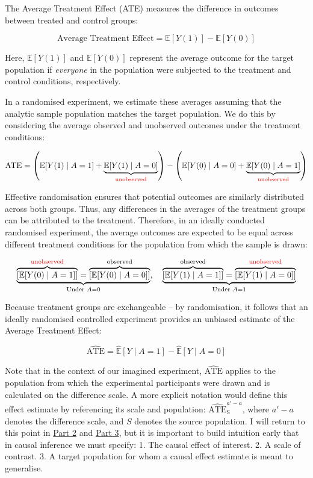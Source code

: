 \documentclass[
  single column]{article}
\begin{document}
The Average Treatment Effect (ATE) measures the difference in outcomes
between treated and control groups:

\[
\text{Average Treatment Effect} = \mathbb{E}[Y(1)] - \mathbb{E}[Y(0)]
\]

Here, \(\mathbb{E}[Y(1)]\) and \(\mathbb{E}[Y(0)]\) represent the
average outcome for the target population if \emph{everyone} in the
population were subjected to the treatment and control conditions,
respectively.

In a randomised experiment, we estimate these averages assuming that the
analytic sample population matches the target population. We do this by
considering the average observed and unobserved outcomes under the
treatment conditions:

\[
\text{ATE} = \left(\mathbb{E}[Y(1) \mid A = 1] + \underbrace{\mathbb{E}[Y(1) \mid A = 0]}_{\textcolor{red}{\text{unobserved}}}\right) - \left(\mathbb{E}[Y(0) \mid A = 0] + \underbrace{\mathbb{E}[Y(0) \mid A = 1]}_{\textcolor{red}{\text{unobserved}}}\right)
\]

Effective randomisation ensures that potential outcomes are similarly
distributed across both groups. Thus, any differences in the averages of
the treatment groups can be attributed to the treatment. Therefore, in
an ideally conducted randomised experiment, the average outcomes are
expected to be equal across different treatment conditions for the
population from which the sample is drawn:

\[
\underbrace{\overbrace{\left[\mathbb{E}[Y(0) \mid A = 1]\right]}^{\textcolor{red}{\text{unobserved}}} = \overbrace{\left[\mathbb{E}[Y(0) \mid A = 0]\right]}^{\text{observed}}}_{\text{Under } A = 0}, \quad \underbrace{\overbrace{\left[\mathbb{E}[Y(1) \mid A = 1]\right]}^{\text{observed}} = \overbrace{\left[\mathbb{E}[Y(1) \mid A = 0]\right]}^{\textcolor{red}{\text{unobserved}}}}_{\text{Under } A = 1}
\]

Because treatment groups are exchangeable -- by randomisation, it
follows that an ideally randomised controlled experiment provides an
unbiased estimate of the Average Treatment Effect:

\[
\widehat{\text{ATE}} = \widehat{\mathbb{E}}[Y \mid A = 1] - \widehat{\mathbb{E}}[Y \mid A = 0]
\]

Note that in the context of our imagined experiment,
\(\widehat{\text{ATE}}\) applies to the population from which the
experimental participants were drawn and is calculated on the difference
scale. A more explicit notation would define this effect estimate by
referencing its scale and population:
\(\widehat{\text{ATE}}^{a'-a}_{\text{S}}\), where \(a'-a\) denotes the
difference scale, and \(S\) denotes the source population. I will return
to this point in \hyperref[id-sec-2]{Part 2} and
\hyperref[id-sec-3]{Part 3}, but it is important to build intuition
early that in causal inference we must specify: 1. The causal effect of
interest. 2. A scale of contrast. 3. A target population for whom a
causal effect estimate is meant to generalise.
\end{document}
